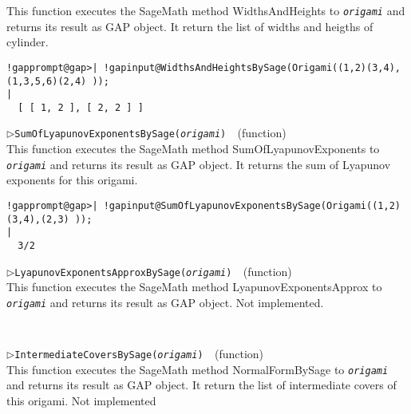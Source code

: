\documentclass[a4paper,11pt]{report}
\begin{document}
{{{ This function executes the SageMath method WidthsAndHeights to \mbox{\texttt{\mdseries\slshape origami}} and returns its result as \textsf{GAP} object. It return the list of widths and heigths of cylinder. 
\begin{Verbatim}[commandchars=!@|,fontsize=\small,frame=single,label=Example]
  !gapprompt@gap>| !gapinput@WidthsAndHeightsBySage(Origami((1,2)(3,4),(1,3,5,6)(2,4) ));        
|
  [ [ 1, 2 ], [ 2, 2 ] ]
\end{Verbatim}
 \noindent\textcolor{FuncColor}{$\triangleright$\enspace\texttt{SumOfLyapunovExponentsBySage({\mdseries\slshape origami})
\label{SumOfLyapunovExponentsBySage}
}\hfill{\scriptsize (function)}}\\


 This function executes the SageMath method SumOfLyapunovExponents to \mbox{\texttt{\mdseries\slshape origami}} and returns its result as \textsf{GAP} object. It returns the sum of Lyapunov exponents for this origami. 
\begin{Verbatim}[commandchars=!@|,fontsize=\small,frame=single,label=Example]
  !gapprompt@gap>| !gapinput@SumOfLyapunovExponentsBySage(Origami((1,2)(3,4),(2,3) ));
|
  3/2
\end{Verbatim}
 \noindent\textcolor{FuncColor}{$\triangleright$\enspace\texttt{LyapunovExponentsApproxBySage({\mdseries\slshape origami})
\label{LyapunovExponentsApproxBySage}
}\hfill{\scriptsize (function)}}\\


 This function executes the SageMath method LyapunovExponentsApprox to \mbox{\texttt{\mdseries\slshape origami}} and returns its result as \textsf{GAP} object. Not implemented. 
\begin{Verbatim}[commandchars=!@|,fontsize=\small,frame=single,label=Example]
  
\end{Verbatim}
 \noindent\textcolor{FuncColor}{$\triangleright$\enspace\texttt{IntermediateCoversBySage({\mdseries\slshape origami})
\label{IntermediateCoversBySage}
}\hfill{\scriptsize (function)}}\\


 This function executes the SageMath method NormalFormBySage to \mbox{\texttt{\mdseries\slshape origami}} and returns its result as \textsf{GAP} object. It return the list of intermediate covers of this origami. Not
implemented 
\begin{Verbatim}[commandchars=!@|,fontsize=\small,frame=single,label=Example]
\end{Verbatim}
 }

 }

 }
\end{document}
